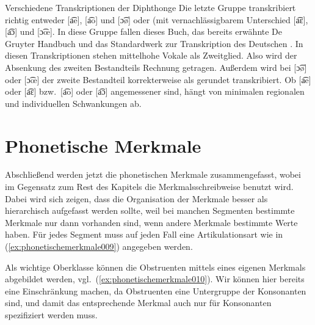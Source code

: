 \begin{Vertiefung}{Verschiedene Transkriptionen der Diphthonge}
Die letzte Gruppe transkribiert richtig entweder [a͡e], [a͡o] und [ɔ͡ø] oder (mit vernachlässigbarem Unterschied [a͡ɛ], [a͡ɔ] und [ɔ͡œ]. 
In diese Gruppe fallen dieses Buch, das bereits erwähnte De Gruyter Handbuch \citep{KrechEa2009} und das Standardwerk zur Transkription des Deutschen \citet[16]{RuesEa2009}.
In diesen Transkriptionen stehen mittelhohe Vokale als Zweitglied.
Also wird der Absenkung des zweiten Bestandteils Rechnung getragen.
Außerdem wird bei [ɔ͡ø] oder [ɔ͡œ] der zweite Bestandteil korrekterweise als gerundet transkribiert.
Ob [a͡e] oder [a͡ɛ] bzw.\ [a͡o] oder [a͡ɔ] angemessener sind, hängt von minimalen regionalen und individuellen Schwankungen ab.

\end{Vertiefung}


\section{Phonetische Merkmale}
\label{sec:phonetischemerkmale}


Abschließend werden jetzt die phonetischen Merkmale zusammengefasst, wobei im Gegensatz zum Rest des Kapitels die Merkmalsschreibweise benutzt wird.
Dabei wird sich zeigen, dass die Organisation der Merkmale besser als hierarchisch aufgefasst werden sollte, weil bei manchen Segmenten bestimmte Merkmale nur dann vorhanden sind, wenn andere Merkmale bestimmte Werte haben.
Für jedes Segment muss auf jeden Fall eine Artikulationsart wie in (\ref{ex:phonetischemerkmale009}) angegeben werden.

\begin{exe}
\end{exe}

Als wichtige Oberklasse können die Obstruenten mittels eines eigenen Merkmals abgebildet werden, vgl.\ (\ref{ex:phonetischemerkmale010}).
Wir können hier bereits eine Einschränkung machen, da Obstruenten eine Untergruppe der Konsonanten sind, und damit das entsprechende Merkmal auch nur für Konsonanten spezifiziert werden muss.

